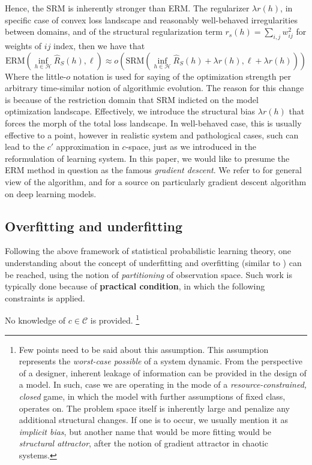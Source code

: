 \documentclass[
  journal=largetwo,
  year=2025,
  volume=37,
]{cup-journal}
\begin{document}
Hence, the SRM is inherently stronger than ERM. The regularizer $\lambda r(h)$, in specific case of convex loss landscape and reasonably well-behaved irregularities between domains, and of the structural regularization term $r_{s}(h)=\sum_{i,j}w_{ij}^{2}$ for weights of $ij$ index, then we have that 
\begin{equation}
    \mathrm{ERM}\left(\inf_{h\in\mathcal{H}} \hat{R}_{S}(h), \ell\right) \approx o\left(\mathrm{SRM}\left(\inf_{h\in\mathcal{H}} \hat{R}_{S}(h) + \lambda r(h), \ell + \lambda r(h)\right)\right)
\end{equation}
Where the little-$o$ notation is used for saying of the optimization strength per arbitrary time-similar notion of algorithmic evolution. The reason for this change is because of the restriction domain that $\mathrm{SRM}$ indicted on the model optimization landscape. Effectively, we introduce the structural bias $\lambda r(h)$ that forces the morph of the total loss landscape. In well-behaved case, this is usually effective to a point, however in realistic system and pathological cases, such can lead to the $c'$ approximation in $c$-space, just as we introduced in the reformulation of learning system. In this paper, we would like to presume the ERM method in question as the famous \textit{gradient descent}. We refer to \cite{achlioptas_stochastic_nodate,ruder_overview_2017} for general view of the algorithm, and \cite{zhang_gradient_2019} for a source on particularly gradient descent algorithm on deep learning models. 

\subsection{Overfitting and underfitting}

Following the above framework of statistical probabilistic learning theory, one understanding about the concept of underfitting and overfitting (similar to \cite{James2021}) can be reached, using the notion of \textit{partitioning} of observation space. Such work is typically done because of \textbf{practical condition}, in which the following constraints is applied.
\begin{assumption}\label{assume:cpi_transparency}
    No knowledge of $c\in\mathcal{C}$ is provided. \footnote{Few points need to be said about this assumption. This assumption represents the \textit{worst-case possible} of a system dynamic. From the perspective of a designer, inherent leakage of information can be provided in the design of a model. In such, case we are operating in the mode of a \textit{resource-constrained, closed} game, in which the model with further assumptions of fixed class, operates on. The problem space itself is inherently large and penalize any additional structural changes. If one is to occur, we usually mention it as \textit{implicit bias}, but another name that would be more fitting would be \textit{structural attractor}, after the notion of gradient attractor in chaotic systems.}
\end{assumption}
\end{document}
